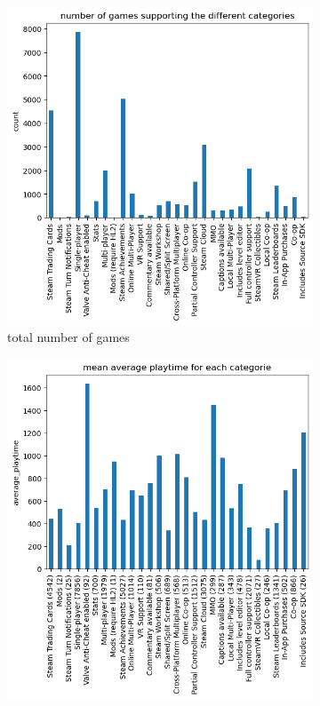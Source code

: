 \documentclass[11pt]{article}
\begin{document}
  \begin{figure}[h]
    \centering
    \begin{subfigure}[b]{0.49\textwidth}
        \centering
        \includegraphics[width=\textwidth]{graphics/insight3_graph3.png}
        \caption{total number of games}
        \label{fig:insight3_3}
    \end{subfigure}
    \hfill
    \begin{subfigure}[b]{0.49\textwidth}
        \centering
        \includegraphics[width=\textwidth]{graphics/insight3_graph4.png}

\end{subfigure}
\end{figure}
\end{document}
